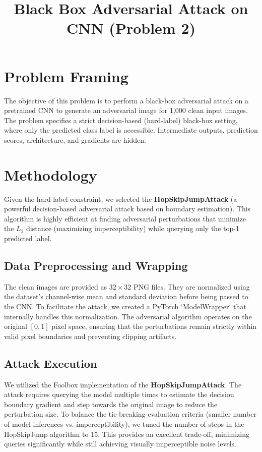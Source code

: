 \documentclass[11pt,a4paper]{article}
\title{Black Box Adversarial Attack on CNN (Problem 2)}
\author{}
\date{}
\begin{document}
\maketitle

\section{Problem Framing}
The objective of this problem is to perform a black-box adversarial attack on a pretrained CNN to generate an adversarial image for 1,000 clean input images. The problem specifies a strict decision-based (hard-label) black-box setting, where only the predicted class label is accessible. Intermediate outputs, prediction scores, architecture, and gradients are hidden.

\section{Methodology}
Given the hard-label constraint, we selected the \textbf{HopSkipJumpAttack} (a powerful decision-based adversarial attack based on boundary estimation). This algorithm is highly efficient at finding adversarial perturbations that minimize the $L_2$ distance (maximizing imperceptibility) while querying only the top-1 predicted label.

\subsection{Data Preprocessing and Wrapping}
The clean images are provided as $32 \times 32$ PNG files. They are normalized using the dataset's channel-wise mean and standard deviation before being passed to the CNN. 
To facilitate the attack, we created a PyTorch `ModelWrapper` that internally handles this normalization. The adversarial algorithm operates on the original $[0, 1]$ pixel space, ensuring that the perturbations remain strictly within valid pixel boundaries and preventing clipping artifacts.

\subsection{Attack Execution}
We utilized the Foolbox implementation of the \textbf{HopSkipJumpAttack}. The attack requires querying the model multiple times to estimate the decision boundary gradient and step towards the original image to reduce the perturbation size.
To balance the tie-breaking evaluation criteria (smaller number of model inferences vs. imperceptibility), we tuned the number of steps in the HopSkipJump algorithm to 15. This provides an excellent trade-off, minimizing queries significantly while still achieving visually imperceptible noise levels.
\end{document}
